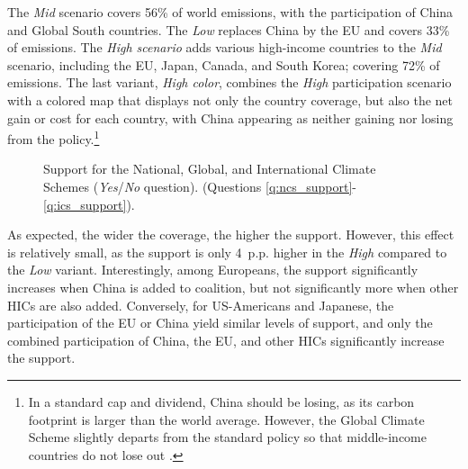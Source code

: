 \documentclass[12pt,english]{article}
\begin{document}
\begin{bibunit}
The \textit{Mid} scenario covers 56\% of world emissions, with the participation of China and Global South countries. The \textit{Low} replaces China by the EU and covers 33\% of emissions. The \textit{High scenario} adds various high-income countries to the \textit{Mid} scenario, including the EU, Japan, Canada, and South Korea; covering 72\% of emissions. The last variant, \textit{High color}, combines the \textit{High} participation scenario with a colored map that displays not only the country coverage, but also the net gain or cost for each country, with China appearing as neither gaining nor losing from the policy.\footnote{In a standard cap and dividend, China should be losing, as its carbon footprint is larger than the world average. However, the Global Climate Scheme slightly departs from the standard policy so that middle-income countries do not lose out \citep{fabre_global_2025}.} 

\begin{figure}[h!]
    \caption[Support for the NCS, GCS, ICS]{Support for the National, Global, and International Climate Schemes (\textit{Yes}/\textit{No} question). \hfill (Questions \ref{q:ncs_support}-\ref{q:ics_support}).
    }\label{fig:ics}
\end{figure}

As expected, the wider the coverage, the higher the support. However, this effect is relatively small, as the support is only 4~p.p. higher in the \textit{High} compared to the \textit{Low} variant. Interestingly, among Europeans, the support significantly increases when China is added to coalition, but not significantly more when other HICs are also added. Conversely, for US-Americans and Japanese, the participation of the EU or China yield similar levels of support, and only the combined participation of China, the EU, and other HICs significantly increase the support. 


\end{bibunit}
\end{document}
